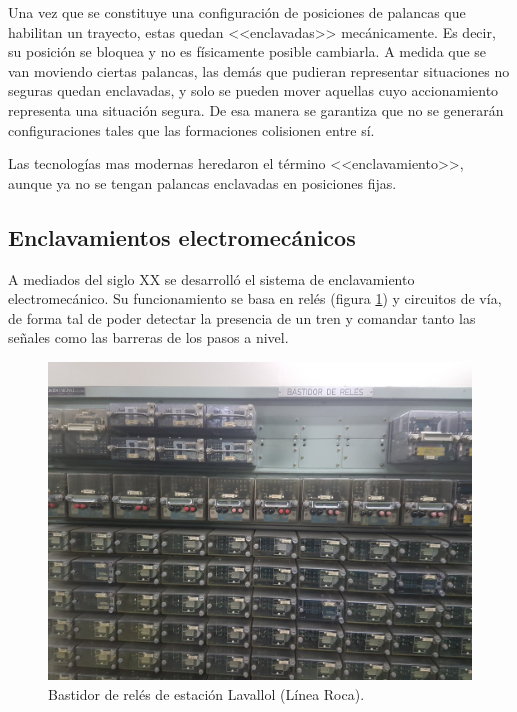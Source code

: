			Una vez que se constituye una configuración de posiciones de palancas que habilitan un trayecto, estas quedan <<enclavadas>> mecánicamente. Es decir, su posición se bloquea y no es físicamente posible cambiarla. A medida que se van moviendo ciertas palancas, las demás que pudieran representar situaciones no seguras quedan enclavadas, y solo se pueden mover aquellas cuyo accionamiento representa una situación segura. De esa manera se garantiza que no se generarán configuraciones tales que las formaciones colisionen entre sí.
			
			Las tecnologías mas modernas heredaron el término <<enclavamiento>>, aunque ya no se tengan palancas enclavadas en posiciones fijas.
		
		\subsection{Enclavamientos electromecánicos}
			
			A mediados del siglo XX se desarrolló el sistema de enclavamiento electromecánico. Su funcionamiento se basa en relés (figura \ref{fig:Reles}) y circuitos de vía, de forma tal de poder detectar la presencia de un tren y comandar tanto las señales como las barreras de los pasos a nivel.
				
			\begin{figure}[htbp!]
				\centering
				\includegraphics[scale=.08]{./Figures/Reles}
				\caption{Bastidor de relés de estación Lavallol (Línea Roca).}
				\label{fig:Reles}
			\end{figure}
		
			\vspace{7cm}
			
